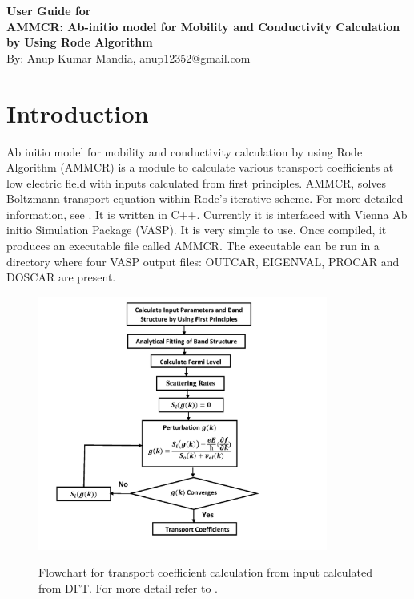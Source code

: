 \documentclass[12pt]{article}
\date{}
\begin{document}
\begin{titlepage}
\begin{center}
\Huge
\textbf{User Guide for \\
AMMCR: Ab-initio model for Mobility and Conductivity Calculation by Using Rode Algorithm\\} 
\vspace{5mm}
\Large 
By: Anup Kumar Mandia, anup12352@gmail.com
\end{center}
\end{titlepage}
  
\tableofcontents

\newpage
  
  
\section{Introduction}
Ab initio model for mobility and conductivity calculation by using Rode Algorithm (AMMCR) is a module to calculate various transport coefficients at low electric field with inputs calculated from first principles. AMMCR, solves Boltzmann transport equation within Rode's iterative scheme. For more detailed information, see \cite{anup1,anup2,anup3}. It is written in C++. Currently it is interfaced with Vienna Ab initio Simulation Package (VASP). It is very simple to use. Once compiled, it produces an executable file called AMMCR. The executable can be run in a directory where four VASP output files: OUTCAR, EIGENVAL, PROCAR and DOSCAR are present. \\

\begin{figure}[!t]
	\centering
	{\includegraphics[height=0.85\textwidth,width=0.85\textwidth]{flowchart.pdf}}
	\quad
	\caption{Flowchart for transport coefficient calculation from input calculated from DFT. For more detail refer to \cite{anup1, anup2, anup3}. }
	\label{flowchart}
\end{figure}
\end{document}

